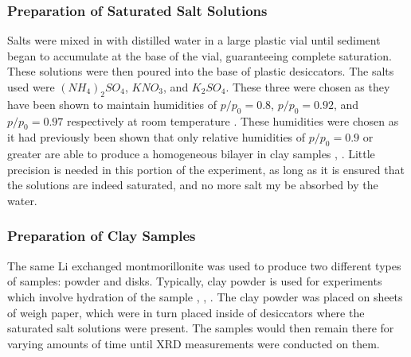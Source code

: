 \subsubsection{Preparation of Saturated Salt Solutions}
Salts were mixed in with distilled water in a large plastic vial until sediment began to accumulate at the base of the vial, guaranteeing complete saturation. These solutions were then poured into the base of plastic desiccators. The salts used were $(NH_4)_2SO_4$, $KNO_3$, and $K_2SO_4$. These three were chosen as they have been shown to maintain humidities of $p/p_0=0.8$, $p/p_0=0.92$, and $p/p_0=0.97$ respectively at room temperature \cite{wexler1954relative}. These humidities were chosen as it had previously been shown that only relative humidities of $p/p_0=0.9$ or greater are able to produce a homogeneous bilayer in clay samples \cite{berend1995mechanism}, \cite{mering1946hydration}. Little precision is needed in this portion of the experiment, as long as it is ensured that the solutions are indeed saturated, and no more salt my be absorbed by the water.

\subsubsection{Preparation of Clay Samples}
The same Li exchanged montmorillonite was used to produce two different types of samples: powder and disks. Typically, clay powder is used for experiments which involve hydration of the sample \cite{aldrich1944hydration}, \cite{berend1995mechanism}, \cite{johnston1992vibrational}. The clay powder was placed on sheets of weigh paper, which were in turn placed inside of desiccators where the saturated salt solutions were present. The samples would then remain there for varying amounts of time until XRD measurements were conducted on them.

